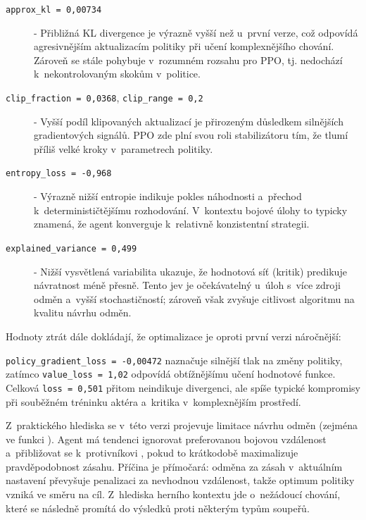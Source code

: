 \begin{description}
    \item[\texttt{approx\_kl = 0{,}00734}] - Přibližná KL divergence je výrazně vyšší než u~první verze, což odpovídá agresivnějším aktualizacím politiky při učení komplexnějšího chování. Zároveň se stále pohybuje v~rozumném rozsahu pro PPO, tj. nedochází k~nekontrolovaným skokům v~politice.

    \item[\texttt{clip\_fraction = 0{,}0368}, \texttt{clip\_range = 0{,}2}] - Vyšší podíl klipovaných aktualizací je přirozeným důsledkem silnějších gradientových signálů. PPO zde plní svou roli stabilizátoru tím, že tlumí příliš velké kroky v~parametrech politiky.

    \item[\texttt{entropy\_loss = -0{,}968}] - Výrazně nižší entropie indikuje pokles náhodnosti a~přechod k~determinističtějšímu rozhodování. V~kontextu bojové úlohy to typicky znamená, že agent konverguje k~relativně konzistentní strategii.

    \item[\texttt{explained\_variance = 0{,}499}] - Nižší vysvětlená variabilita ukazuje, že hodnotová síť (kritik) predikuje návratnost méně přesně. Tento jev je očekávatelný u~úloh s~více zdroji odměn a~vyšší stochastičností; zároveň však zvyšuje citlivost algoritmu na kvalitu návrhu odměn.
\end{description}

\newpage

Hodnoty ztrát dále dokládají, že optimalizace je oproti první verzi náročnější: 

\texttt{policy\_gradient\_loss = -0{,}00472} naznačuje silnější tlak na změny politiky, zatímco \texttt{value\_loss = 1{,}02} odpovídá obtížnějšímu učení hodnotové funkce. Celková \texttt{loss = 0{,}501} přitom neindikuje divergenci, ale spíše typické kompromisy při souběžném tréninku aktéra a~kritika v~komplexnějším prostředí.

Z~praktického hlediska se v~této verzi projevuje limitace návrhu odměn (zejména ve funkci ). Agent má tendenci ignorovat preferovanou bojovou vzdálenost a~přibližovat se k~protivníkovi , pokud to krátkodobě maximalizuje pravděpodobnost zásahu. Příčina je přímočará: odměna za zásah v~aktuálním nastavení převyšuje penalizaci za nevhodnou vzdálenost, takže optimum politiky vzniká ve směru  na cíl. Z~hlediska herního kontextu jde o~nežádoucí chování, které se následně promítá do výsledků proti některým typům soupeřů.

